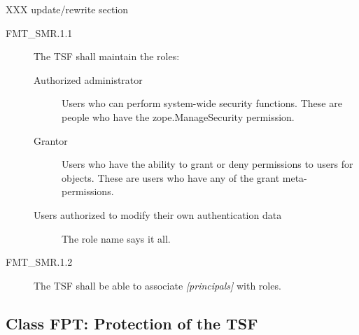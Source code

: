\documentclass[10pt,a4paper,english]{scrbook}
\begin{document}
XXX update/rewrite section
\begin{description}
\item[FMT{\_}SMR.1.1]

The TSF shall maintain the roles:
\begin{description}
\item[Authorized administrator]

Users who can perform system-wide security functions. These are
people who have the zope.ManageSecurity permission.

\item[Grantor ]

Users who have the ability to grant or deny permissions to
users for objects.  These are users who have any of the grant
meta-permissions.

\item[Users authorized to modify their own authentication data]

The role name says it all.

\end{description}

\item[FMT{\_}SMR.1.2]

The TSF shall be able to associate \emph{{[}principals]} with roles.

\end{description}



\hypertarget{class-fpt-protection-of-the-tsf}{}
\subsection{Class FPT: Protection of the TSF}



\hypertarget{fpt-amt-1-abstract-machine-testing}{}
\end{document}
